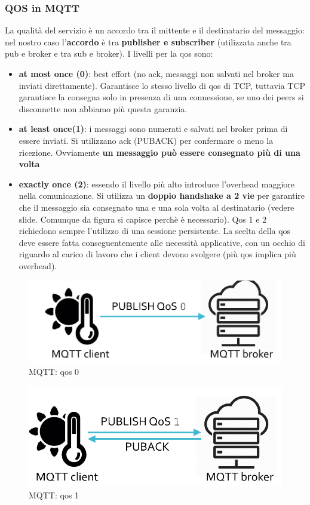\documentclass[12pt]{article}
\begin{document}
    		\subsubsection{QOS in MQTT}
    			La qualità del servizio è un accordo tra il mittente e il destinatario del messaggio: nel nostro caso l'\textbf{accordo} è tra \textbf{publisher e subscriber} (utilizzata anche tra pub e broker e tra sub e broker). I livelli per la qos sono:
    			\begin{itemize}
    				\item \textbf{at most once (0)}: best effort (no ack, messaggi non salvati nel broker ma inviati direttamente). Garantisce lo stesso livello di qos di TCP, tuttavia TCP garantisce la consegna solo in presenza di una connessione, se uno dei peers si disconnette non abbiamo più questa garanzia.
    				\item \textbf{at least once(1)}: i messaggi sono numerati e salvati nel broker prima di essere inviati. Si utilizzano ack (PUBACK) per confermare o meno la ricezione. Ovviamente \textbf{un messaggio può essere consegnato più di una volta}
    				\item \textbf{exactly once (2)}: essendo il livello più alto introduce l'overhead maggiore nella comunicazione. Si utilizza un \textbf{doppio handshake a 2 vie} per garantire che il messaggio sia consegnato una e una sola volta al destinatario (vedere slide. Comunque da figura si capisce perchè è necessario). Qos 1 e 2 richiedono sempre l'utilizzo di una sessione persistente. La scelta della qos deve essere fatta conseguentemente alle necessità applicative, con un occhio di riguardo al carico di lavoro che i client devono svolgere (più qos implica più overhead). 	
    			\end{itemize}
    			\begin{figure}[h!]
    				\centering
    				\includegraphics[scale=0.3]{img/qos1.png}
    				\caption{MQTT: qos 0}
    			\end{figure}
    			\begin{figure}[h!]
    				\centering
    				\includegraphics[scale=0.3]{img/qos2.png}
    				\caption{MQTT: qos 1}
    			\end{figure}
\end{document}
